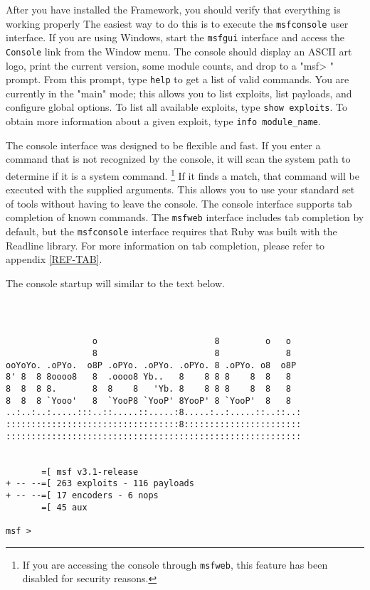 \documentclass{report}
\begin{document}
\par
After you have installed the Framework, you should verify that everything is
working properly  The easiest way to do this is to execute the
\texttt{msfconsole} user interface. If you are using Windows, start the \texttt{msfgui}
interface and access the \texttt{Console} link from the Window menu.
The console should display an ASCII art logo, print the current version, some module
counts, and drop to a "msf> " prompt. From this prompt, type \texttt{help} to get a list of
valid commands. You are currently in the "main" mode; this allows you to list
exploits, list payloads, and configure global options.  To list all available
exploits, type \texttt{show exploits}. To obtain more information about a given
exploit, type \texttt{info module\_name}. 

\par
The console interface was designed to be flexible and fast. If you
enter a command that is not recognized by the console, it will scan the system
path to determine if it is a system command. \footnote{If you are accessing the console
through \texttt{msfweb}, this feature has been disabled for security reasons.}
If it finds a match, that command will be executed with the supplied arguments. This allows you to use
your standard set of tools without having to leave the console. The console interface
supports tab completion of known commands. The \texttt{msfweb} interface
includes tab completion by default, but the \texttt{msfconsole} interface requires that 
Ruby was built with the Readline library. For more information on tab completion, please
refer to appendix \ref{REF-TAB}.

\par
The console startup will similar to the text below.

\begin{verbatim}



                 o                       8         o   o
                 8                       8             8
ooYoYo. .oPYo.  o8P .oPYo. .oPYo. .oPYo. 8 .oPYo. o8  o8P
8' 8  8 8oooo8   8  .oooo8 Yb..   8    8 8 8    8  8   8
8  8  8 8.       8  8    8   'Yb. 8    8 8 8    8  8   8
8  8  8 `Yooo'   8  `YooP8 `YooP' 8YooP' 8 `YooP'  8   8
..:..:..:.....:::..::.....::.....:8.....:..:.....::..::..:
::::::::::::::::::::::::::::::::::8:::::::::::::::::::::::
::::::::::::::::::::::::::::::::::::::::::::::::::::::::::


       =[ msf v3.1-release
+ -- --=[ 263 exploits - 116 payloads
+ -- --=[ 17 encoders - 6 nops
       =[ 45 aux

msf >            
\end{verbatim}
\end{document}
